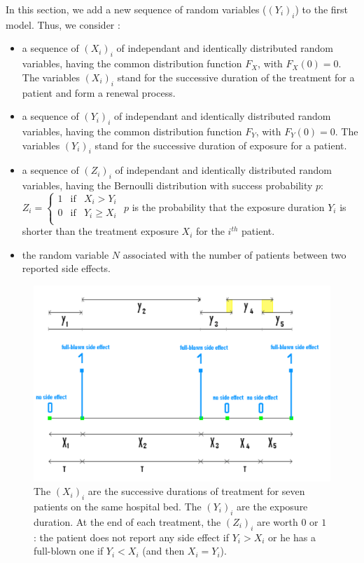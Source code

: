 \documentclass[12pt,twoside]{article}
\begin{document}
In this section, we add a new sequence of random variables ($(Y_i)_i$) to the first model. Thus, we consider : 
\begin{itemize}
	\item a sequence of $(X_i)_i$ of independant and identically distributed random variables, 
		having the common distribution function $F_X$, with $F_X(0)=0$.
		The variables $(X_i)_i$ stand for the successive duration of the treatment for a patient and form a renewal process.
	\item a sequence of $(Y_i)_i$ of independant and identically distributed random variables, 
		having the common distribution function $F_Y$, with $F_Y(0)=0$.
		The variables $(Y_i)_i$ stand for the successive duration of exposure for a patient.
	\item a sequence of $(Z_i)_i$ of independant and identically distributed random variables, 
		having the Bernoulli distribution with success probability $p$:\\
		 $
Z_i =
\left\{
\begin{array} {lll}
1 & \textrm{if} & X_i > Y_i \\
0 & \textrm{if} & Y_i \geq X_i\\
\end{array}
\right.
$
		$p$ is the probability that the exposure duration $Y_i$ is shorter than the treatment exposure $X_i$ for the $i^{th}$ patient. 
	\item the random variable $N$ associated with the number of patients between two reported side effects.\\
\end{itemize}

\begin{figure}[htb!]
\begin{center}
\includegraphics[width=14cm]{mod2.pdf} 

\caption{ The $(X_i)_i$ are the successive durations of treatment for seven patients on the same hospital bed. The $(Y_i)_i$ are the exposure duration. At the end of each treatment, the $(Z_i)_i$ are worth $0$ or $1$ : the patient does not report any side effect if $Y_i > X_i$ or he has a full-blown one if $Y_i < X_i$ (and then $X_i = Y_i$). }
\label{mod2}
\end{center}
\end{figure}
\end{document}
